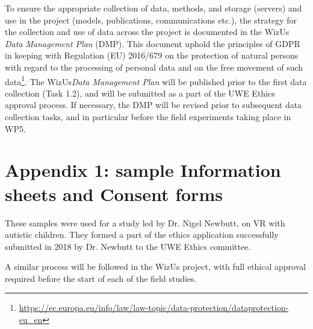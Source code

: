 \documentclass[11pt,a4paper]{report}
\newcommand{\project}{WizUs\xspace}
\newcommand{\eu}[1]{}
\begin{document}
To ensure the appropriate collection of data, methods, and storage (servers) and
use in the project (models, publications, communications etc.), the strategy for
the collection and use of data across the project is documented in the \project
\emph{Data Management Plan} (DMP). This document uphold the principles of GDPR in
keeping with Regulation (EU) 2016/679 on the protection of natural persons with
regard to the processing of personal data and on the free movement of such
data\footnote{\url{https://ec.europa.eu/info/law/law-topic/data-protection/dataprotection-eu_en}}.
The \project \emph{Data Management Plan} will be published prior to the first
data collection (Task 1.2), and will be submitted as a part of the UWE Ethics
approval process. If necessary, the DMP will be revised prior to subsequent data
collection tasks, and in particular before the field experiments taking place in
WP5.

 
\eu{
If you have entered any ethics issues in the ethical issue table in the administrative proposal forms, you must:
    • submit an ethics self-assessment, which:
        ◦ describes how the proposal meets the national legal and ethical requirements of the country or countries where the tasks raising ethical issues are to be carried out;
        ◦ explains in detail how you intend to address the issues in the ethical issues table, in particular as regards:
        ◦ research objectives (e.g. study of vulnerable populations, dual use, etc.)
        ◦ research methodology (e.g. clinical trials, involvement of children and related consent procedures, protection of any data collected, etc.)
        ◦ the potential impact of the research (e.g. dual use issues, environmental damage, stigmatisation  of  particular  social  groups,  political  or  financial  retaliation, benefit-sharing,  malevolent use , etc.).
    • provide the documents that you need under national law(if you already have them), e.g.:
        ◦ an ethics committee opinion;
        ◦ the document notifying activities raising ethical issues or authorising such activities
 If these documents are not in English, you must also submit an English summary of them(containing, if available, the conclusions of the committee or authority concerned).
 If you plan to request these documents specifically for the project you are
 proposing, your request must contain an explicit reference to the project
 title.
}

\newpage
\section{Appendix 1: sample Information sheets and Consent forms}

These samples were used for a study led by Dr. Nigel Newbutt, on VR with
autistic children. They formed a part of the ethics application successfully
submitted in 2018 by Dr. Newbutt to the UWE Ethics committee.

A similar process will be followed in the \project project, with full ethical
approval required before the start of each of the field studies.


\end{document}
